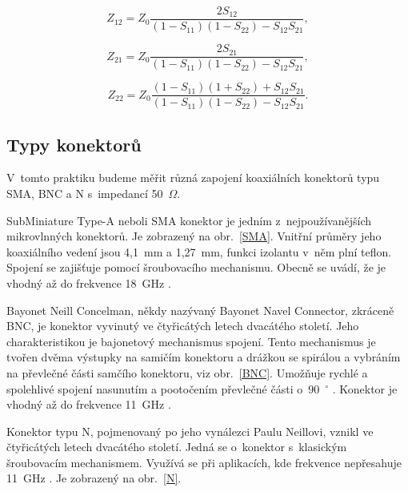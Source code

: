 \documentclass{protokol}
\begin{document}
\begin{equation}
	Z_{12} = Z_0
	\frac{2S_{12}}{(1-S_{11})(1-S_{22})-S_{12}S_{21}},
\end{equation}

\begin{equation}
	Z_{21} = Z_0
	\frac{2S_{21}}{(1-S_{11})(1-S_{22})-S_{12}S_{21}},
\end{equation}

\begin{equation}
	Z_{22} = Z_0
	\frac{(1-S_{11})(1+S_{22})+S_{12}S_{21}}{(1-S_{11})(1-S_{22})-S_{12}S_{21}}.
\end{equation}

\subsection{Typy konektorů}
V~tomto praktiku budeme měřit různá zapojení koaxiálních konektorů typu
SMA, BNC a N s~impedancí 50~$\Omega$.

SubMiniature Type-A neboli SMA konektor je jedním z~nejpoužívanějších
mikrovlnných konektorů. Je zobrazený na obr.~\ref{SMA}.
Vnitřní průměry jeho koaxiálního vedení jsou 4,1~mm a 1,27~mm,
funkci izolantu v~něm plní teflon.
Spojení se zajišťuje pomocí šroubovacího mechanismu.
Obecně se uvádí, že je vhodný až do frekvence 18~GHz \cite{rfhandbook}.

Bayonet Neill Concelman, někdy nazývaný Bayonet Navel Connector,
zkráceně BNC, je konektor vyvinutý ve čtyřicátých letech dvacátého století.
Jeho charakteristikou je bajonetový mechanismus spojení.
Tento mechanismus je tvořen dvěma výstupky na samičím konektoru
a drážkou se spirálou a vybráním na převlečné části samčího konektoru,
viz obr.~\ref{BNC}.
Umožňuje rychlé a spolehlivé spojení nasunutím a pootočením převlečné
části o~90~$^{\circ}$ \cite{czwiki}.
Konektor je vhodný až do frekvence 11~GHz \cite{rfhandbook}.

Konektor typu N, pojmenovaný po jeho vynálezci Paulu Neillovi,
vznikl ve čtyřicátých letech dvacátého století.
Jedná se o~konektor s~klasickým šroubovacím mechanismem.
Využívá se při aplikacích, kde frekvence nepřesahuje 11~GHz \cite{rfhandbook}.
Je zobrazený na obr.~\ref{N}.
\end{document}
